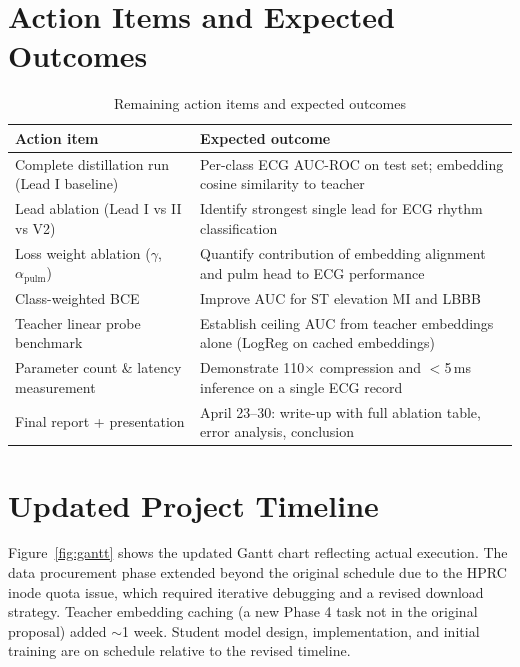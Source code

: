 \documentclass[sigconf,nonacm]{acmart}
\begin{document}
\section{Action Items and Expected Outcomes}

\begin{table}[h]
\caption{Remaining action items and expected outcomes}
\label{tab:action}
\begin{tabular}{p{3.5cm}p{4cm}}
\toprule
Action item & Expected outcome \\
\midrule
Complete distillation run (Lead I baseline) &
  Per-class ECG AUC-ROC on test set; embedding cosine similarity to teacher \\
\addlinespace
Lead ablation (Lead I vs II vs V2) &
  Identify strongest single lead for ECG rhythm classification \\
\addlinespace
Loss weight ablation ($\gamma$, $\alpha_\text{pulm}$) &
  Quantify contribution of embedding alignment and pulm head to ECG performance \\
\addlinespace
Class-weighted BCE &
  Improve AUC for ST elevation MI and LBBB \\
\addlinespace
Teacher linear probe benchmark &
  Establish ceiling AUC from teacher embeddings alone (LogReg on cached embeddings) \\
\addlinespace
Parameter count \& latency measurement &
  Demonstrate 110$\times$ compression and $<$5\,ms inference on a single ECG record \\
\addlinespace
Final report + presentation &
  April 23–30: write-up with full ablation table, error analysis, conclusion \\
\bottomrule
\end{tabular}
\end{table}

\section{Updated Project Timeline}

Figure~\ref{fig:gantt} shows the updated Gantt chart reflecting actual
execution. The data procurement phase extended beyond the original schedule
due to the HPRC inode quota issue, which required iterative debugging
and a revised download strategy. Teacher embedding caching (a new Phase 4
task not in the original proposal) added $\sim$1 week. Student model
design, implementation, and initial training are on schedule relative to
the revised timeline.
\end{document}
